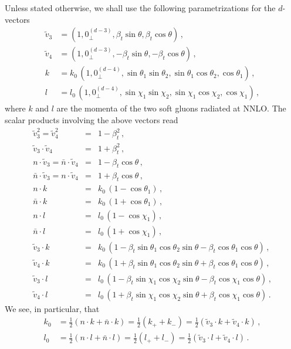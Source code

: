 \documentclass[a4paper,11pt]{article}
\newcommand{\nbar}{\ensuremath{\bar{n}}}
\numberwithin{equation}{section}
\begin{document}
Unless stated otherwise, we shall use the following parametrizations for the
$d$-vectors
\begin{subequations}
  \label{eq:kparam}
  \begin{align}
  \tilde v_3 & =  (1,0_\perp^{(d-3)},\beta_t\sin\theta,\beta_t\cos\theta)\,, \\
  \tilde v_4 & =  (1,0_\perp^{(d-3)},-\beta_t\sin\theta,-\beta_t\cos\theta)\,,\\
  k & =  k_0\, (1,0_\perp^{(d-4)},\sin\theta_1\sin\theta_2,
               \sin\theta_1\cos\theta_2,\cos\theta_1)\,, \\
  l & =  l_0\, (1,0_\perp^{(d-4)},\sin\chi_1\sin\chi_2,
               \sin\chi_1\cos\chi_2,\cos\chi_1)\,, 
  \end{align}
\end{subequations}
%
where $k$ and $l$ are the momenta of the two soft gluons radiated at NNLO.
%
The scalar products involving the above vectors read
%
\allowdisplaybreaks
\begin{eqnarray}
  \tilde v_3^2  =  \tilde v_4^2 & = & 1-\beta_t^2\,,
  \\
  \tilde v_3 \cdot \tilde v_4  & = & 1+\beta_t^2\,, \\
  n\cdot \tilde v_3 = \nbar \cdot \tilde v_4 & = & 1-\beta_t \cos\theta\,, \\
  \nbar\cdot \tilde v_3 = n \cdot \tilde v_4 & = & 1+\beta_t \cos\theta\,, \\
  n \cdot k & = & k_0\, (1-\cos\theta_1)\,, \\
  \nbar \cdot k & = & k_0\, (1+\cos\theta_1)\,, \\
  n \cdot l & = & l_0\, (1-\cos\chi_1)\,, \\
  \nbar \cdot l & = & l_0\, (1+\cos\chi_1)\,, \\
  \tilde v_3 \cdot k & = & k_0\, (1-\beta_t\sin\theta_1\cos\theta_2\sin\theta -
  \beta_t\cos\theta_1\cos\theta)\,, 
  \label{eq:tv3k} \\
  \tilde v_4 \cdot k & = & k_0\, (1+\beta_t\sin\theta_1\cos\theta_2\sin\theta +
  \beta_t\cos\theta_1\cos\theta)\,,
  \label{eq:tv4k} \\
  \tilde v_3 \cdot l & = & l_0\, (1-\beta_t\sin\chi_1\cos\chi_2\sin\theta-
  \beta_t\cos\chi_1\cos\theta)\,, \\
  \tilde v_4 \cdot l & = & l_0\, (1+\beta_t\sin\chi_1\cos\chi_2\sin\theta+
  \beta_t\cos\chi_1\cos\theta)\,.
\end{eqnarray}
%
We see, in particular, that
%
\begin{subequations}
  \begin{align}
   k_0 & = \frac12\left(n\cdot k + \nbar \cdot k\right) 
         = \frac12\left(k_+ + k_-\right)
         = \frac12\left(\tilde v_3\cdot k+\tilde v_4 \cdot k\right)\,,
   \\[0.5em]
   l_0 & = \frac12\left(n\cdot l + \nbar \cdot l\right) 
         = \frac12\left(l_+ + l_-\right)
         = \frac12\left(\tilde v_3\cdot l+\tilde v_4 \cdot l\right)\,.
  \end{align}
\end{subequations}
\end{document}
